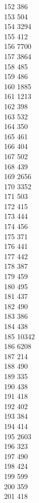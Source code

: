 { 152	386 \\
 153	504 \\
 154	3294 \\
 155	412 \\
 156	7700 \\
 157	3864 \\
 158	485 \\
 159	486 \\
 160	1885 \\
 161	1213 \\
 162	398 \\
 163	532 \\
 164	350 \\
 165	461 \\
 166	404 \\
 167	502 \\
 168	439 \\
 169	2656 \\
 170	3352 \\
 171	503 \\
 172	415 \\
 173	444 \\
 174	456 \\
 175	371 \\
 176	441 \\
 177	442 \\
 178	387 \\
 179	459 \\
 180	495 \\
 181	437 \\
 182	490 \\
 183	386 \\
 184	438 \\
 185	10342 \\
 186	6208 \\
 187	214 \\
 188	490 \\
 189	335 \\
 190	438 \\
 191	418 \\
 192	402 \\
 193	384 \\
 194	414 \\
 195	2603 \\
 196	323 \\
 197	490 \\
 198	424 \\
 199	599 \\
 200	359 \\
 201	418 \\
}
